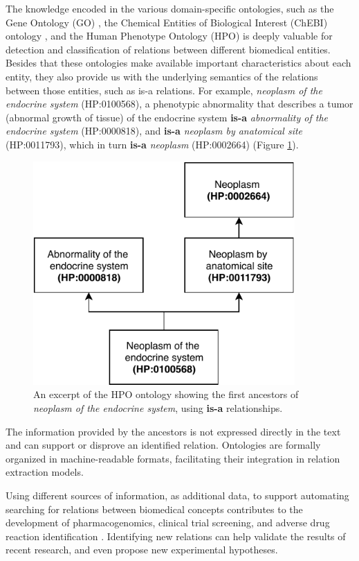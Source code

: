The knowledge encoded in the various domain-specific ontologies, such as the Gene Ontology (GO) \citep{GO}, the Chemical Entities of Biological Interest (ChEBI) ontology \citep{CHEBI}, and the Human Phenotype Ontology (HPO) \citep{HPO} is deeply valuable for detection and classification of relations between different biomedical entities. Besides that these ontologies make available important characteristics about each entity, they also provide us with the underlying semantics of the relations between those entities, such as is-a relations. For example, \textit{neoplasm of the endocrine system} (HP:0100568), a phenotypic abnormality that describes a tumor (abnormal growth of tissue) of the endocrine system \textbf{is-a} \textit{abnormality of the endocrine system} (HP:0000818), and \textbf{is-a} \textit{neoplasm by anatomical site} (HP:0011793), which in turn \textbf{is-a} \textit{neoplasm} (HP:0002664) (Figure \ref{figure:1}). 

\begin{figure}[ht]
\captionsetup{font=small}
\centering
\includegraphics[width=10cm]{images/figure_1.pdf}
\fontsize{9}{10.8}\caption[HPO Ontology Excerpt]{An excerpt of the HPO ontology showing the first ancestors of \textit{neoplasm of the endocrine system}, using \textbf{is-a} relationships.}
\label{figure:1}
\end{figure}

The information provided by the ancestors is not expressed directly in the text and can support or disprove an identified relation. Ontologies are formally organized in machine-readable formats, facilitating their integration in relation extraction models. 

Using different sources of information, as additional data, to support automating searching for relations between biomedical concepts contributes to the development of pharmacogenomics, clinical trial screening, and adverse drug reaction identification \citep{10.1093/bib/bbx048}. Identifying new relations can help validate the results of recent research, and even propose new experimental hypotheses.

